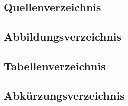 



\chapter[Verzeichnisse]{} %




\section{Quellenverzeichnis}
\newpage

\section{Abbildungsverzeichnis}
\newpage

\section{Tabellenverzeichnis}
\newpage

\section{Abkürzungsverzeichnis}
% 
\newpage







